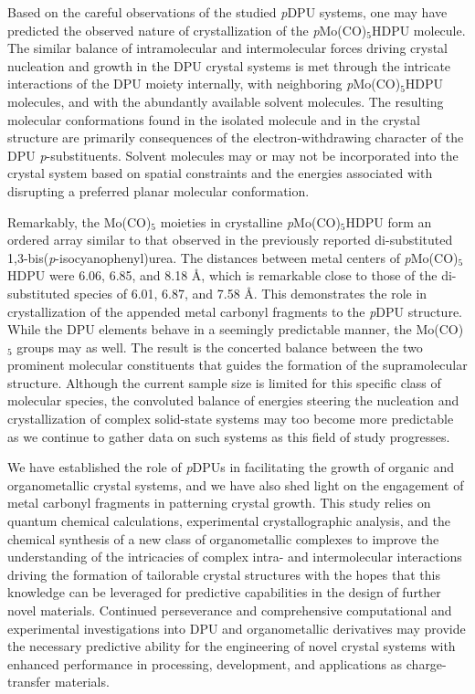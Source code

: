 Based on the careful observations of the studied \textit{p}DPU systems, one may have predicted the observed nature of crystallization of the \textit{p}Mo(CO)$_{5}$HDPU molecule. The similar balance of intramolecular and intermolecular forces driving crystal nucleation and growth in the DPU crystal systems is met through the intricate interactions of the DPU moiety internally, with neighboring \textit{p}Mo(CO)$_{5}$HDPU molecules, and with the abundantly available solvent molecules. The resulting molecular conformations found in the isolated molecule and in the crystal structure are primarily consequences of the electron-withdrawing character of the DPU \textit{p}-substituents. Solvent molecules may or may not be incorporated into the crystal system based on spatial constraints and the energies associated with disrupting a preferred planar molecular conformation.

Remarkably, the Mo(CO)$_{5}$ moieties in crystalline \textit{p}Mo(CO)$_{5}$HDPU form an ordered array similar to that observed in the previously reported di-substituted 1,3-bis(\textit{p}-isocyanophenyl)urea. The distances between metal centers of \textit{p}Mo(CO)$_{5}$HDPU were 6.06, 6.85, and 8.18 \AA, which is remarkable close to those of the di-substituted species of 6.01, 6.87, and 7.58 \AA. This demonstrates the role in crystallization of the appended metal carbonyl fragments to the \textit{p}DPU structure. While the DPU elements behave in a seemingly predictable manner, the Mo(CO)$_{5}$ groups may as well. The result is the concerted balance between the two prominent molecular constituents that guides the formation of the supramolecular structure. Although the current sample size is limited for this specific class of molecular species, the convoluted balance of energies steering the nucleation and crystallization of complex solid-state systems may too become more predictable as we continue to gather data on such systems as this field of study progresses. 

We have established the role of \textit{p}DPUs in facilitating the growth of organic and organometallic crystal systems, and we have also shed light on the engagement of metal carbonyl fragments in patterning crystal growth. This study relies on quantum chemical calculations, experimental crystallographic analysis, and the chemical synthesis of a new class of organometallic complexes to improve the understanding of the intricacies of complex intra- and intermolecular interactions driving the formation of tailorable crystal structures with the hopes that this knowledge can be leveraged for predictive capabilities in the design of further novel materials. Continued perseverance and comprehensive computational and experimental investigations into DPU and organometallic derivatives may provide the necessary predictive ability for the engineering of novel crystal systems with enhanced performance in processing, development, and applications as charge-transfer materials.

